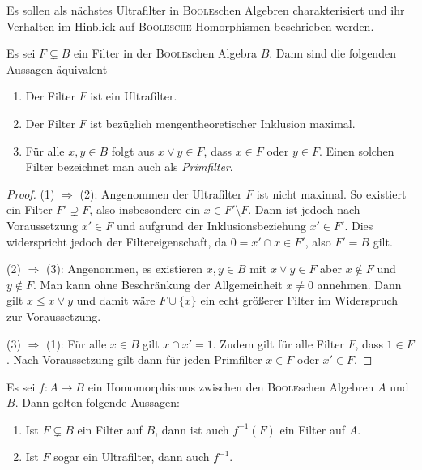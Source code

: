 Es sollen als nächstes Ultrafilter in \textsc{Boole}schen Algebren charakterisiert und ihr Verhalten im Hinblick auf \textsc{Boolesche} Homorphismen beschrieben werden.

\begin{prop}
  \label{prop:ultrafilterchar}
  Es sei $F \subsetneq B$ ein Filter in der \textsc{Boole}schen Algebra $B$. Dann sind die folgenden Aussagen äquivalent
  \begin{enumerate}[(1)]
    \item Der Filter $F$ ist ein Ultrafilter.
    \item Der Filter $F$ ist bezüglich mengentheoretischer Inklusion maximal.
    \item Für alle $x,y \in B$ folgt aus $x \lor y \in F$, dass $x \in F$ oder $y \in F$. Einen solchen Filter bezeichnet man auch als \emph{Primfilter}.
  \end{enumerate}
\end{prop}

\begin{proof}
  (1) $\Rightarrow$ (2):
  Angenommen der Ultrafilter $F$ ist nicht maximal. 
  So existiert ein Filter $F' \supsetneq F$, also insbesondere ein $x \in F' \setminus F$.
  Dann ist jedoch nach Voraussetzung $x' \in F$ und aufgrund der Inklusionsbeziehung $x' \in F'$.
  Dies widerspricht jedoch der Filtereigenschaft, da $0 = x' \cap x \in F'$, also $F' = B$ gilt.

  (2) $\Rightarrow$ (3):
  Angenommen, es existieren $x,y \in B$ mit $x \lor y \in F$ aber $x \not\in F$ und $y \not\in F$.
  Man kann ohne Beschränkung der Allgemeinheit $x \neq 0$ annehmen.
  Dann gilt $x \leq x \lor y$ und damit wäre $F \cup \{x\}$ ein echt größerer Filter im Widerspruch zur Voraussetzung.

  (3) $\Rightarrow$ (1):
  Für alle $x \in B$ gilt $x \cap x' = 1$.
  Zudem gilt für alle Filter $F$, dass $1 \in F$.
  Nach Voraussetzung gilt dann für jeden Primfilter $x \in F$ oder $x' \in F$.
\end{proof}

\begin{lem}
  \label{lem:boolehomfilters}
  Es sei $f \colon A \to B$ ein Homomorphismus zwischen den \textsc{Boole}schen Algebren $A$ und $B$.
  Dann gelten folgende Aussagen:
  \begin{enumerate}[(1)]
    \item Ist $F \subsetneq B$ ein Filter auf $B$, dann ist auch $f^{-1}(F)$ ein Filter auf $A$.
    \item Ist $F$ sogar ein Ultrafilter, dann auch $f^{-1}$.
  \end{enumerate}
\end{lem}

